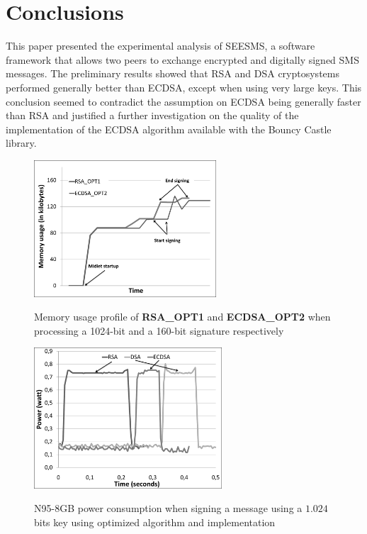 \documentclass[authoryear]{elsarticle}
\begin{document}
\section{Conclusions}
This paper presented the experimental analysis of SEESMS, a software framework that allows two peers to exchange encrypted and digitally signed SMS  messages. The preliminary results showed that RSA and DSA cryptosystems performed generally better than ECDSA, except when using very large keys. This conclusion seemed to contradict the assumption on ECDSA being generally faster than RSA and justified a further investigation on the quality of the implementation of the ECDSA algorithm available with the Bouncy Castle library.


\begin{figure}[h]
\begin{center}
  \includegraphics[width=6.8cm]{immagini/MemoryRSA1ECDSA2.pdf}\\
  \caption{Memory usage profile of \textbf{RSA\_OPT1} and \textbf{ECDSA\_OPT2} when processing a 1024-bit and a 160-bit signature respectively}
  \label{fig:MemoryRSA1ECDSA2}
\end{center}
\end{figure}


\begin{figure}[h]
\begin{center}
  \includegraphics[width=7cm]{immagini/Power_OPT.pdf}\\
  \caption{N95-8GB power consumption when signing a message using a $1.024$ bits key using optimized algorithm and implementation}
  \label{fig:N95Power_OPT}
\end{center}
\end{figure}
\end{document}
